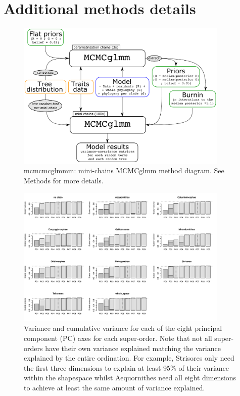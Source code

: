 \documentclass[12pt,a4paper]{article}
\begin{document}

%
%

\section{Additional methods details}

\begin{figure}[H]
\centering
   \includegraphics[width=0.9\textwidth]{Figures/mini-chains_diagram.pdf}
\caption{mcmcmcglmmm: mini-chains MCMCglmm method diagram. See Methods for more details.}
\label{Fig:mcmcmcglmm}
\end{figure}

\newpage

\begin{figure}[H]
\centering
   \includegraphics[width=0.9\textwidth]{Figures/axis_selection.pdf}
\caption{Variance and cumulative variance for each of the eight principal component (PC) axes for each super-order. Note that not all super-orders have their own variance explained matching the variance explained by the entire ordination. For example, Strisores only need the first three dimensions to explain at least 95\% of their variance within the shapespace whilst Aequornithes need all eight dimensions to achieve at least the same amount of variance explained.}
\label{Fig:axes_variance}
\end{figure}
\end{document}
